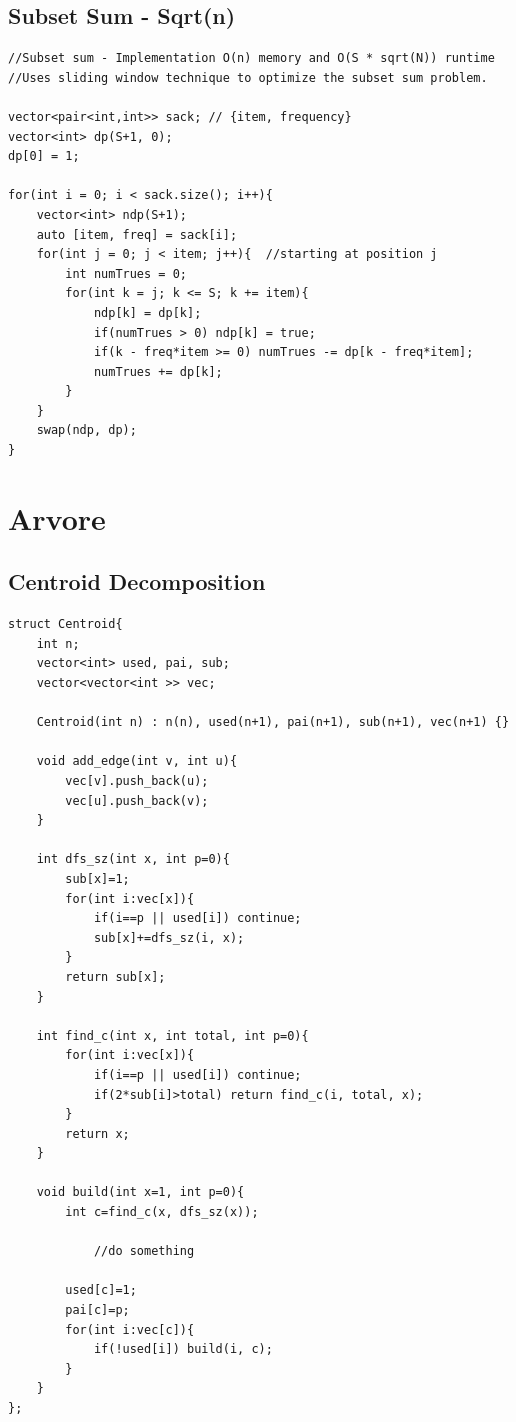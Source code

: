\documentclass[11pt, a4paper, twoside]{article}
\begin{document}
\subsection{Subset Sum - Sqrt(n)}
\begin{verbatim}
//Subset sum - Implementation O(n) memory and O(S * sqrt(N)) runtime
//Uses sliding window technique to optimize the subset sum problem.

vector<pair<int,int>> sack; // {item, frequency}
vector<int> dp(S+1, 0);
dp[0] = 1;

for(int i = 0; i < sack.size(); i++){
    vector<int> ndp(S+1);
    auto [item, freq] = sack[i];
    for(int j = 0; j < item; j++){  //starting at position j
        int numTrues = 0;
        for(int k = j; k <= S; k += item){
            ndp[k] = dp[k];
            if(numTrues > 0) ndp[k] = true;
            if(k - freq*item >= 0) numTrues -= dp[k - freq*item];
            numTrues += dp[k];
        }
    }
    swap(ndp, dp);
}
\end{verbatim}



%
%

\section{Arvore}

\subsection{Centroid Decomposition}
\begin{verbatim}
struct Centroid{
    int n;
    vector<int> used, pai, sub;
    vector<vector<int >> vec;
    
    Centroid(int n) : n(n), used(n+1), pai(n+1), sub(n+1), vec(n+1) {}
    
    void add_edge(int v, int u){
        vec[v].push_back(u);
        vec[u].push_back(v);
    }
    
    int dfs_sz(int x, int p=0){
        sub[x]=1;
        for(int i:vec[x]){
            if(i==p || used[i]) continue;
            sub[x]+=dfs_sz(i, x);
        }
        return sub[x];
    }
    
    int find_c(int x, int total, int p=0){
        for(int i:vec[x]){
            if(i==p || used[i]) continue;
            if(2*sub[i]>total) return find_c(i, total, x);
        }
        return x;
    }
        
    void build(int x=1, int p=0){
        int c=find_c(x, dfs_sz(x));
    
            //do something
            
        used[c]=1;
        pai[c]=p;
        for(int i:vec[c]){
            if(!used[i]) build(i, c);
        }
    }
};
\end{verbatim}
\end{document}
